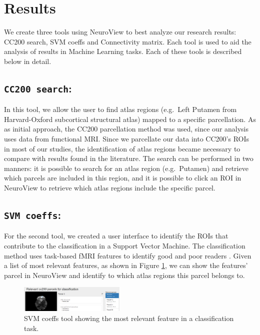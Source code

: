\documentclass[twocolumn]{bmcart}%
\begin{document}
\section{Results}\label{results}

We create three tools using NeuroView to best analyze our research
results: CC200 search, SVM coeffs and Connectivity matrix. Each tool is
used to aid the analysis of results in Machine Learning tasks. Each of
these tools is described below in detail.

\subsection{\texorpdfstring{\texttt{CC200 search}:}{:}}\label{section}

In this tool, we allow the user to find atlas regions (e.g.~Left Putamen
from Harvard-Oxford subcortical structural atlas) mapped to a specific
parcellation. As as initial approach, the CC200 \cite{Craddock2012}
parcellation method was used, since our analysis uses data from
functional MRI. Since we parcellate our data into CC200's ROIs in most
of our studies, the identification of atlas regions became necessary to
compare with results found in the literature. The search can be
performed in two manners: it is possible to search for an atlas region
(e.g.~Putamen) and retrieve which parcels are included in this region,
and it is possible to click an ROI in NeuroView to retrieve which atlas
regions include the specific parcel.

\subsection{\texorpdfstring{\texttt{SVM coeffs}:}{:}}\label{section-1}

For the second tool, we created a user interface to identify the ROIs
that contribute to the classification in a Support Vector Machine. The
classification method uses task-based fMRI features to identify good and
poor readers \cite{Salles2013}. Given a list of most relevant features,
as shown in Figure \ref{fig:svm_coeffs}, we can show the features'
parcel in NeuroView and identify to which atlas regions this parcel
belongs to.

\begin{figure}[ht]
\centering
\includegraphics[width=0.45\textwidth]{figs/svm_coeffs.png}
\caption{SVM coeffs tool showing the most relevant feature in a classification task.}
\label{fig:svm_coeffs}
\end{figure}
\end{document}
